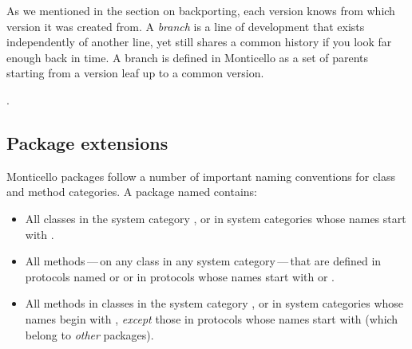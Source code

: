 \documentclass[a4paper,10pt,twoside]{book}
\begin{document}
As we mentioned in the section on backporting, each version knows from which version it was created from. A \emph{branch} is a line of development that exists independently of another line, yet still shares a common history if you look far enough back in time. A branch is defined in Monticello as a set of parents starting from a version leaf up to a common version.


.  





\subsection{Package extensions}

 

Monticello packages follow a number of important naming conventions for class and method categories.
A package named  contains:

\begin{itemize}
\item All classes in the system category , or in system categories whose names start with .
\item All methods\,---\,on any class in any system category\,---\,that are defined in protocols named  or  or in protocols whose names start with  or .

\item All methods in classes in the system category , or in system categories whose names begin with , \emph{except} those in protocols whose names start with \prot{*} (\ie which belong to \emph{other} packages).
\end{itemize}
\end{document}
